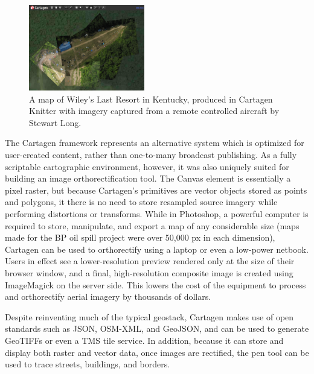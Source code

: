 \documentclass[11pt]{report}
\begin{document}
\begin{figure}
	\begin{flushright}
		\includegraphics[width=0.45\textwidth]{images/knitter-wileys.png}
		\caption{A map of Wiley's Last Resort in Kentucky, produced in Cartagen Knitter with imagery captured from a remote controlled aircraft by Stewart Long.}
	\end{flushright}
\end{figure}

The Cartagen framework represents an alternative system which is optimized for user-created content, rather than one-to-many broadcast publishing. As a fully scriptable cartographic environment, however, it was also uniquely suited for building an image orthorectification tool. The Canvas element is essentially a pixel raster, but because Cartagen's primitives are vector objects stored as points and polygons, it there is no need to store resampled source imagery while performing distortions or transforms. While in Photoshop, a powerful computer is required to store, manipulate, and export a map of any considerable size (maps made for the BP oil spill project were over 50,000 px in each dimension), Cartagen can be used to orthorectify using a laptop or even a low-power netbook. Users in effect see a lower-resolution preview rendered only at the size of their browser window, and a final, high-resolution composite image is created using ImageMagick on the server side. This lowers the cost of the equipment to process and orthorectify aerial imagery by thousands of dollars. 



Despite reinventing much of the typical geostack, Cartagen makes use of open standards such as JSON, OSM-XML, and GeoJSON, and can be used to generate \ac{GeoTIFF}s or even a \ac{TMS} tile service. In addition, because it can store and display both raster and vector data, once images are rectified, the pen tool can be used to trace streets, buildings, and borders.   
\end{document}
